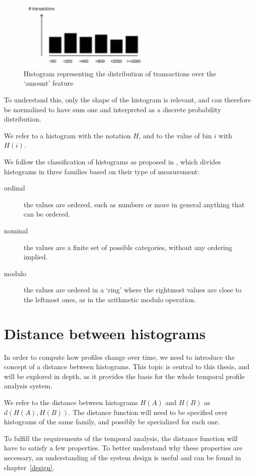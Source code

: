 \begin{figure}[h]
\centering
\includegraphics[width=250]{images/flat_histogram.pdf}
\caption{Histogram representing the distribution of transactions over the `amount' feature}
\label{fig:flat_histogram}
\end{figure}

To understand this, only the shape of the histogram is relevant, and can therefore be normalized to have sum one and interpreted as a discrete probability distribution.

We refer to a histogram with the notation $H$, and to the value of bin $i$ with $H(i)$.

We follow the classification of histograms as proposed in \cite{histogram}, which divides histograms in three families based on their type of measurement:

\begin{description}
\item[ordinal] the values are ordered, such as numbers or more in general anything that can be ordered.
\item[nominal] the values are a finite set of possible categories, without any ordering implied.
\item[modulo] the values are ordered in a `ring' where the rightmost values are close to the leftmost ones, as in the arithmetic modulo operation.
\end{description}

\section{Distance between histograms}

In order to compute how profiles change over time, we need to introduce the concept of a distance between histograms. This topic is central to this thesis, and will be explored in depth, as it provides the basis for the whole temporal profile analysis system.

We refer to the distance between histograms $H(A)$ and $H(B)$ as $d(H(A), H(B))$.
The distance function will need to be specified over histograms of the same family, and possibly be specialized for each one.

To fulfill the requirements of the temporal analysis, the distance function will have to satisfy a few properties. To better understand why these properties are necessary, an understanding of the system design is useful and can be found in chapter~\ref{design}.

